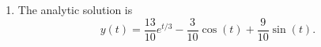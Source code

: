 \begin{example}
\begin{enumerate}
\[\begin{array}{ccc|c}
                    1 & 1 & 0 & 1 \\ 
                    0 & 1 & 1/3 & 0 \\ 
                    0 & 1/3 & -1 & -1 \end{array} \right) \to 
                \left( \begin{array}{ccc|c}  
                    1 & 0 & -1/3 & 1 \\ 
                    0 & 1 & 1/3 & 0 \\ 
                    0 & 0 & -10/9 & -1 \end{array} \right) \to 
                \left( \begin{array}{ccc|c}  
                    1 & 0 & 0 & 13/10 \\ 
                    0 & 1 & 0 & -3/10 \\ 
                    0 & 0 & 1 & 9/10 \end{array} \right).
            \]
        \item The analytic solution is
            \[ y(t) = \frac{13}{10} e^{t/3} - \frac{3}{10} \cos(t) + \frac{9}{10} \sin(t). \]
    \end{enumerate}
\end{example}



